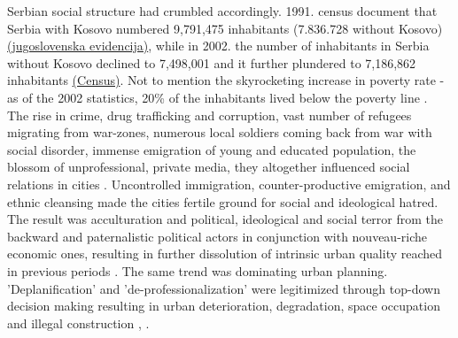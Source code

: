 \documentclass[11pt]{report}
\begin{document}
Serbian social structure had crumbled accordingly. 1991. census document that Serbia with Kosovo numbered 9,791,475 inhabitants (7.836.728 without Kosovo) \href{}{(jugoslovenska evidencija)}, while in 2002. the number of inhabitants in Serbia without Kosovo declined to 7,498,001 and it further plundered to 7,186,862 inhabitants \href{}{(Census)}.
Not to mention the skyrocketing increase in poverty rate - as of the 2002 statistics, 20\% of the inhabitants lived below the poverty line \cite{Vladina strategija za smanjenje siromastva}.
\\

The rise in crime, drug trafficking and corruption, vast number of refugees migrating from war-zones, numerous local soldiers coming back from war with social disorder, immense emigration of young and educated population, the blossom of unprofessional, private media, they altogether influenced social relations in cities \href{}{\citealt{doytchinov_urban_2015}}.
Uncontrolled immigration, counter-productive emigration,  and ethnic cleansing made the cities fertile ground for social and ideological hatred.
The result was acculturation and political, ideological and social terror from the backward and paternalistic political actors in conjunction with nouveau-riche economic ones, resulting in further dissolution of intrinsic urban quality reached in previous periods \href{}{\citealt{doytchinov_belgrade_2015}}.
The same trend was dominating urban planning. 'Deplanification' and 'de-professionalization' were legitimized through top-down decision making resulting in urban deterioration, degradation, space occupation and illegal construction \href{}{\citealt{vujovic_belgrades_2007}}, \href{}{\citealt{vukmirovic_city_2013}}.
\\
\end{document}
